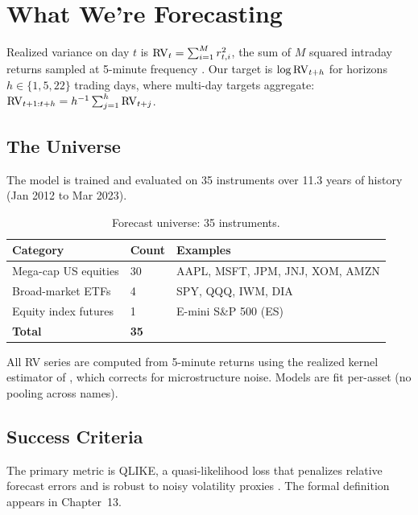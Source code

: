 \chapter{What We're Forecasting}
\label{ch:what-we-forecast}

Realized variance on day $t$ is $\operatorname{RV}_t = \sum_{i=1}^{M} r_{t,i}^2$, the sum of $M$ squared intraday returns sampled at 5-minute frequency \citep{ABDL2003}.
Our target is $\log \operatorname{RV}_{t+h}$ for horizons $h \in \{1, 5, 22\}$ trading days, where multi-day targets aggregate: $\operatorname{RV}_{t+1:t+h} = h^{-1}\sum_{j=1}^{h} \operatorname{RV}_{t+j}$.

\section{The Universe}

The model is trained and evaluated on 35 instruments over 11.3 years of history (Jan 2012 to Mar 2023).

\begin{table}[ht]
\centering
\caption{Forecast universe: 35 instruments.}
\label{tab:universe}
\begin{tabular}{@{}lll@{}}
\toprule
Category & Count & Examples \\
\midrule
Mega-cap US equities & 30 & AAPL, MSFT, JPM, JNJ, XOM, AMZN \\
Broad-market ETFs    & 4  & SPY, QQQ, IWM, DIA \\
Equity index futures & 1  & E-mini S\&P 500 (ES) \\
\midrule
\textbf{Total}       & \textbf{35} & \\
\bottomrule
\end{tabular}
\end{table}

All RV series are computed from 5-minute returns using the realized kernel estimator of \citet{BNHLS2008}, which corrects for microstructure noise.
Models are fit per-asset (no pooling across names).

\section{Success Criteria}

The primary metric is QLIKE, a quasi-likelihood loss that penalizes relative forecast errors and is robust to noisy volatility proxies \citep{Patton2011}.
The formal definition appears in Chapter~13.

